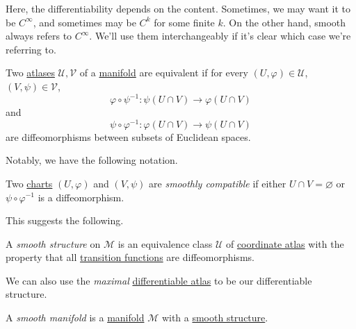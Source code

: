 \begin{remark}
	Here, the differentiability depends on the content. Sometimes, we may want it to be \(C^{\infty} \), and sometimes may be \(C^k\) for some finite \(k\). On the other hand, smooth always refers to \(C^{\infty} \). We'll use them interchangeably if it's clear which case we're referring to.
\end{remark}

\begin{definition}\label{def:equivalence-atlas}
	Two \hyperref[def:atlas]{atlases} \(\mathcal{U} , \mathcal{V} \) of a \hyperref[def:topological-manifold]{manifold} are equivalent if for every \((U, \varphi)\in \mathcal{U} \), \((V, \psi)\in \mathcal{V} \),
	\[
		\varphi \circ \psi ^{-1} \colon \psi(U \cap V) \to \varphi (U \cap V)
	\]
	and
	\[
		\psi \circ \varphi ^{-1} \colon \varphi (U \cap V) \to \psi(U \cap V)
	\]
	are diffeomorphisms between subsets of Euclidean spaces.
\end{definition}

Notably, we have the following notation.

\begin{notation}\label{not:smoothly-compatible}
	Two \hyperref[def:coordinate-chart]{charts} \((U, \varphi )\) and \((V, \psi)\) are \emph{smoothly compatible} if either \(U \cap V = \varnothing \) or \(\psi \circ \varphi ^{-1} \) is a diffeomorphism.
\end{notation}

This suggests the following.

\begin{definition}\label{def:smooth-structure}
	A \emph{smooth structure} on \(\mathcal{M} \) is an equivalence class \(\mathcal{U} \) of \hyperref[def:atlas]{coordinate atlas} with the property that all \hyperref[def:coordinate-transition]{transition functions} are diffeomorphisms.
\end{definition}

\begin{remark}
	We can also use the \emph{maximal} \hyperref[def:differentiable-atlas]{differentiable atlas} to be our differentiable structure.
\end{remark}

\begin{definition}\label{def:smooth-manifold}
	A \emph{smooth manifold} is a \hyperref[def:topological-manifold]{manifold} \(\mathcal{M} \) with a \hyperref[def:smooth-structure]{smooth structure}.
\end{definition}

